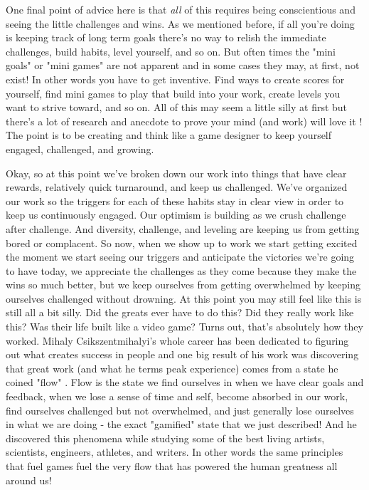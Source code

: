 \documentclass[11pt,a5paper]{book}
\begin{document}
One final point of advice here is that \textit{all} of this requires being conscientious and seeing the little challenges and wins. As we mentioned before, if all you're doing is keeping track of long term goals there's no way to relish the immediate challenges, build habits, level yourself, and so on. But often times the "mini goals" or "mini games" are not apparent and in some cases they may, at first, not exist! In other words you have to get inventive. Find ways to create scores for yourself, find mini games to play that build into your work, create levels you want to strive toward, and so on. All of this may seem a little silly at first but there's a lot of research and anecdote to prove your mind (and work) will love it \cite{superbetter}! The point is to be creating and think like a game designer to keep yourself engaged, challenged, and growing. 
\newline

Okay, so at this point we've broken down our work into things that have clear rewards, relatively quick turnaround, and keep us challenged. We've organized our work so the triggers for each of these habits stay in clear view in order to keep us continuously engaged. Our optimism is building as we crush challenge after challenge. And diversity, challenge, and leveling are keeping us from getting bored or complacent. So now, when we show up to work we start getting excited the moment we start seeing our triggers and anticipate the victories we're going to have today, we appreciate the challenges as they come because they make the wins so much better, but we keep ourselves from getting overwhelmed by keeping ourselves challenged without drowning. At this point you may still feel like this is still all a bit silly. Did the greats ever have to do this? Did they really work like this? Was their life built like a video game? Turns out, that's absolutely how they worked. Mihaly Csikszentmihalyi's whole career has been dedicated to figuring out what creates success in people and one big result of his work was discovering that great work (and what he terms peak experience) comes from a state he coined "flow" \cite{flow}. Flow is the state we find ourselves in when we have clear goals and feedback, when we lose a sense of time and self, become absorbed in our work, find ourselves challenged but not overwhelmed, and just generally lose ourselves in what we are doing - the exact "gamified" state that we just described! And he discovered this phenomena while studying some of the best living artists, scientists, engineers, athletes, and writers. In other words the same principles that fuel games fuel the very flow that has powered the human greatness all around us!
\newline
\end{document}

